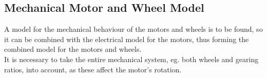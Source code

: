 
\subsection{Mechanical Motor and Wheel Model}
A model for the mechanical behaviour of the motors and wheels is to be found, so it can be combined with the electrical model for the motors, thus forming the combined model for the motors and wheels. \\
It is necessary to take the entire mechanical system, eg. both wheels and gearing ratios, into account, as these affect the motor's rotation.

